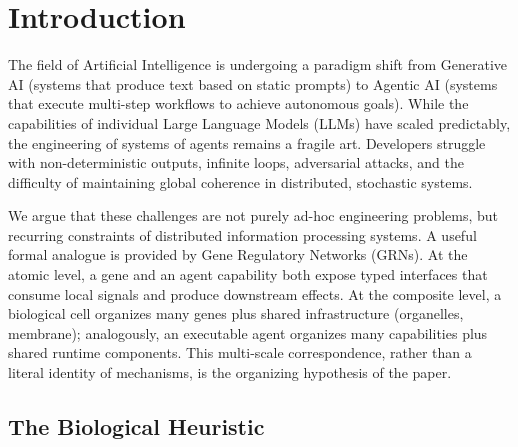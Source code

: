 \section{Introduction}

The field of Artificial Intelligence is undergoing a paradigm shift from Generative AI (systems that
produce text based on static prompts) to Agentic AI (systems that execute multi-step workflows to
achieve autonomous goals). While the capabilities of individual Large Language Models (LLMs) have
scaled predictably, the engineering of systems of agents remains a fragile art. Developers struggle with
non-deterministic outputs, infinite loops, adversarial attacks, and the difficulty of maintaining global
coherence in distributed, stochastic systems.

We argue that these challenges are not purely ad-hoc engineering problems, but recurring constraints of
distributed information processing systems. A useful formal analogue is provided by Gene Regulatory
Networks (GRNs). At the atomic level, a gene and an agent capability both expose typed interfaces that
consume local signals and produce downstream effects. At the composite level, a biological cell organizes
many genes plus shared infrastructure (organelles, membrane); analogously, an executable agent organizes
many capabilities plus shared runtime components. This multi-scale correspondence, rather than a literal
identity of mechanisms, is the organizing hypothesis of the paper.

\subsection{The Biological Heuristic}

